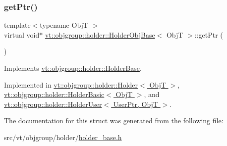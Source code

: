\mbox{\label{structvt_1_1objgroup_1_1holder_1_1_holder_obj_base_aa08fdb3d076043c004e3674a136f84c3}} 
\subsubsection{\texorpdfstring{get\+Ptr()}{getPtr()}}
{\footnotesize\ttfamily template$<$typename ObjT $>$ \\
virtual void$\ast$ \hyperlink{structvt_1_1objgroup_1_1holder_1_1_holder_obj_base}{vt\+::objgroup\+::holder\+::\+Holder\+Obj\+Base}$<$ ObjT $>$\+::get\+Ptr (\begin{DoxyParamCaption}{ }\end{DoxyParamCaption})\hspace{0.3cm}{\ttfamily [pure virtual]}}



Implements \hyperlink{structvt_1_1objgroup_1_1holder_1_1_holder_base_a0b40d32b476b94586468abb5ae9a53a6}{vt\+::objgroup\+::holder\+::\+Holder\+Base}.



Implemented in \hyperlink{structvt_1_1objgroup_1_1holder_1_1_holder_a856859dca0c0ee3fb6ebace444a36200}{vt\+::objgroup\+::holder\+::\+Holder$<$ Obj\+T $>$}, \hyperlink{structvt_1_1objgroup_1_1holder_1_1_holder_basic_a2a8962345709045e6d2c465b17362885}{vt\+::objgroup\+::holder\+::\+Holder\+Basic$<$ Obj\+T $>$}, and \hyperlink{structvt_1_1objgroup_1_1holder_1_1_holder_user_a92734867a29d21a7f165cbb4052717db}{vt\+::objgroup\+::holder\+::\+Holder\+User$<$ User\+Ptr, Obj\+T $>$}.



The documentation for this struct was generated from the following file\+:\begin{DoxyCompactItemize}
\item 
src/vt/objgroup/holder/\hyperlink{holder__base_8h}{holder\+\_\+base.\+h}\end{DoxyCompactItemize}
